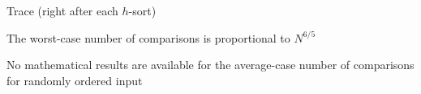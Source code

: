 \documentclass[8pt,a4paper,compress]{beamer}
\begin{document}
\begin{frame}[fragile]
\pause

Trace (right after each $h$-sort)
\begin{center}
\end{center}
\end{frame}

\begin{frame}[fragile]
\pause

The worst-case number of comparisons is proportional to $N^{6/5}$

\pause
\bigskip

No mathematical results are available for the average-case number of comparisons for randomly ordered input
\end{frame}
\end{document}
